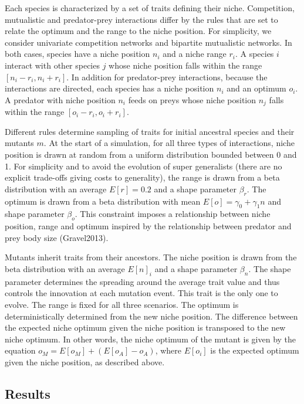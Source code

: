 \documentclass[12pt]{article}
\begin{document}
Each species is characterized by a set of traits defining their niche.
Competition, mutualistic and predator-prey interactions differ by the rules
that are set to relate the optimum and the range to the niche position. For
simplicity, we consider univariate competition networks and bipartite
mutualistic networks. In both cases, species have a niche position $n_i$ and a
niche range $r_i$. A species $i$ interact with other species $j$ whose niche
position falls within the range $[n_i - r_i, n_i + r_i]$. In addition for
predator-prey interactions, because the interactions are directed, each
species has a niche position $n_i$ and an optimum $o_i$. A predator with niche
position $n_i$ feeds on preys whose niche position $n_j$ falls within the
range $[o_i - r_i, o_i + r_i]$.

Different rules determine sampling of traits for initial ancestral species and
their mutants $m$. At the start of a simulation, for all three types of
interactions, niche position is drawn at random from a uniform distribution
bounded between 0 and 1. For simplicity and to avoid the evolution of super
generalists (there are no explicit trade-offs giving costs to generality), the
range is drawn from a beta distribution with an average $E[r] = 0.2$ and a
shape parameter $\beta_{r}$. The optimum is drawn from a beta distribution
with mean $E[o] = \gamma_0 + \gamma_1n$ and shape parameter $\beta_{o}$. This
constraint imposes a relationship between niche position, range and optimum
inspired by the relationship between predator and prey body size (Gravel2013).

Mutants inherit traits from their ancestors. The niche position is drawn from
the beta distribution with an average $E[n]_i$ and a shape parameter
$\beta_{n}$. The shape parameter determines the spreading around the average
trait value and thus controls the innovation at each mutation event. This
trait is the only one to evolve. The range is fixed for all three scenarios.
The optimum is deterministically determined from the new niche position. The
difference between the expected niche optimum given the niche position is
transposed to the new niche optimum. In other words, the niche optimum of the
mutant is given by the equation $o_M = E[o_M] + (E[o_A] - o_A)$, where
$E[o_i]$ is the expected optimum given the niche position, as described above.

\subsection*{Results}
\end{document}
